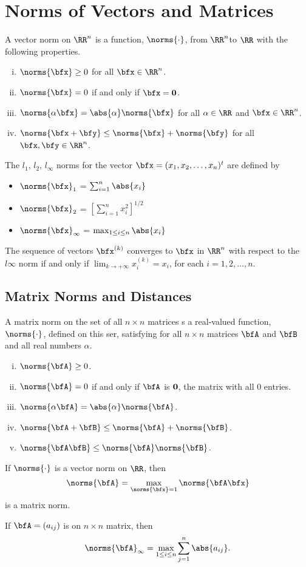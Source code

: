 \section{Norms of Vectors and Matrices}
\begin{defn}
A vector norm on $\RR^n$ is a function, $\norms{\cdot}$, from $\RR^n $to $\RR$ with the following properties.
\begin{enumerate}[(i)]
    \item $\norms{\bfx}\geq 0$ for all $\bfx\in\RR^n$.
    \item $\norms{\bfx}=0$ if and only if $\bfx=\bf 0$.
    \item $\norms{\alpha\bfx}=\abs{\alpha}\norms{\bfx}$ for all $\alpha\in\RR$ and $\bfx\in\RR^n$.
    \item $\norms{\bfx+\bfy}\leq\norms{\bfx}+\norms{\bfy}$ for all $\bfx,\bfy\in\RR^n$.
\end{enumerate}
\end{defn}

\begin{defn}
The $l_1$, $l_2$, $l_\infty$ norms for the vector $\bfx=(x_1,x_2,\ldots,x_n)^t$ are defined by
\begin{itemize}
    \item $\norms{\bfx}_1$ = $\sum_{i=1}^n\abs{x_i}$
    \item $\norms{\bfx}_2$ = $\left[\sum_{i=1}^n{x_i^2}\right]^{1/2}$
    \item $\norms{\bfx}_\infty$ = $\max_{1\leq i\leq n}\abs{x_i}$
\end{itemize}
\end{defn}

\begin{theo}
The sequence of vectors ${\bfx^{(k)}}$ converges to $\bfx$ in $\RR^n$ with respect to the $l\infty$ norm if and only
if $\lim_{k\to +\infty}x_i^{(k)}=x_i$, for each $i=1,2,\ldots,n$.
\end{theo}

\subsection{Matrix Norms and Distances}
\begin{defn}
A matrix norm on the set of all $n\times n$ matrices s a real-valued function, $\norms{\cdot}$, defined on this ser, satisfying for all $n\times n$ matrices $\bfA$ and $\bfB$ and all real numbers $\alpha$.
\begin{enumerate}[(i)]
    \item $\norms{\bfA}\geq 0$.
    \item $\norms{\bfA}=0$ if and only if $\bfA$ is $\bf 0$, the matrix with all 0 entries.
    \item $\norms{\alpha\bfA}=\abs{\alpha}\norms{\bfA}$.
    \item $\norms{\bfA+\bfB}\leq\norms{\bfA}+\norms{\bfB}$.
    \item $\norms{\bfA\bfB}\leq\norms{\bfA}\norms{\bfB}$.
\end{enumerate}
\end{defn}

\begin{theo}
If $\norms{\cdot}$ is a vector norm on $\RR$, then
\[
\norms{\bfA}=\max_{\norms{\bfx}=1}\norms{\bfA\bfx}
\]
is a matrix norm.
\end{theo}

\begin{theo}
If $\bfA=(a_{ij})$ is on $n\times n$ matrix, then
\[
\norms{\bfA}_\infty=\max_{1\leq i\leq n}\sum_{j=1}^n\abs{a_{ij}}.
\]
\end{theo}
